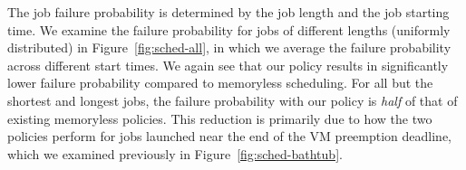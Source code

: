 The job failure probability is determined by the job length and the job starting time.
We examine the failure probability for jobs of different lengths (uniformly distributed) in Figure~\ref{fig:sched-all}, in which we average the failure probability across different start times.
We again see that our policy results in significantly lower failure probability compared to memoryless scheduling.
For all but the shortest and longest jobs, the failure probability with our policy is \emph{half} of that of existing memoryless policies. 
This reduction is primarily due to how the two policies perform for jobs launched near the end of the VM preemption deadline, which we examined previously in Figure~\ref{fig:sched-bathtub}. 

